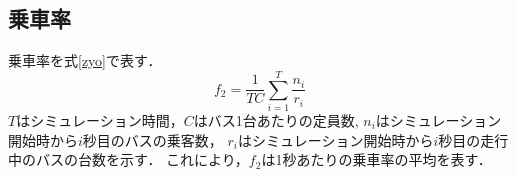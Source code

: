 \documentclass[main]{subfiles}
\begin{document}
        \subsection{乗車率}
        乗車率を式\ref{zyo}で表す．
        \begin{equation}
            f_2 = \frac{1}{TC} \sum_{i=1}^{T} \frac{n_i}{r_i}
            \label{zyo}
        \end{equation}
        $T$はシミュレーション時間，$C$はバス1台あたりの定員数, $n_i$はシミュレーション開始時から$i$秒目のバスの乗客数，
        $r_i$はシミュレーション開始時から$i$秒目の走行中のバスの台数を示す．
        これにより，$f_2$は1秒あたりの乗車率の平均を表す．
\end{document}

